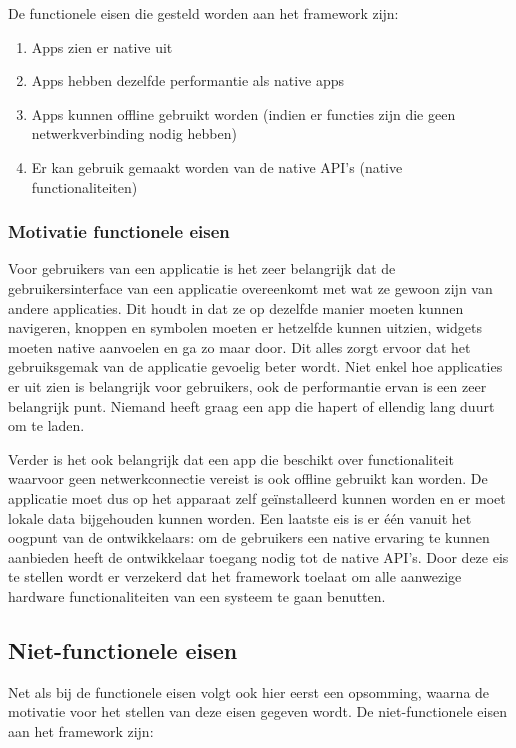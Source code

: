 De functionele eisen die gesteld worden aan het framework zijn:

\begin{enumerate}
    \item Apps zien er native uit
    \item Apps hebben dezelfde performantie als native apps
    \item Apps kunnen offline gebruikt worden (indien er functies zijn die geen netwerkverbinding nodig hebben)
    \item Er kan gebruik gemaakt worden van de native API's (native functionaliteiten)
\end{enumerate}

\subsubsection{Motivatie functionele eisen}
\label{subsubsec:MotivatieFunctioneleEisen}

Voor gebruikers van een applicatie is het zeer belangrijk dat de gebruikersinterface van een applicatie overeenkomt met wat ze gewoon zijn van andere applicaties. Dit houdt in dat ze op dezelfde manier moeten kunnen navigeren, knoppen en symbolen moeten er hetzelfde kunnen uitzien, widgets moeten native aanvoelen en ga zo maar door. Dit alles zorgt ervoor dat het gebruiksgemak van de applicatie gevoelig beter wordt. Niet enkel hoe applicaties er uit zien is belangrijk voor gebruikers, ook de performantie ervan is een zeer belangrijk punt. Niemand heeft graag een app die hapert of ellendig lang duurt om te laden. 

Verder is het ook belangrijk dat een app die beschikt over functionaliteit waarvoor geen netwerkconnectie vereist is ook offline gebruikt kan worden. De applicatie moet dus op het apparaat zelf geïnstalleerd kunnen worden en er moet lokale data bijgehouden kunnen worden. Een laatste eis is er één vanuit het oogpunt van de ontwikkelaars: om de gebruikers een native ervaring te kunnen aanbieden heeft de ontwikkelaar toegang nodig tot de native API's. Door deze eis te stellen wordt er verzekerd dat het framework toelaat om alle aanwezige hardware functionaliteiten van een systeem te gaan benutten.

\subsection{Niet-functionele eisen}
\label{subsec:nietFunctioneleEisen}

Net als bij de functionele eisen volgt ook hier eerst een opsomming, waarna de motivatie voor het stellen van deze eisen gegeven wordt. De niet-functionele eisen aan het framework zijn:

